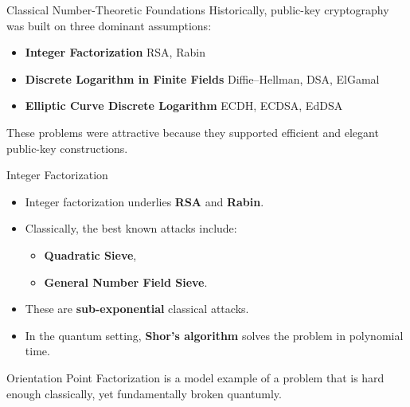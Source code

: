 \documentclass[aspectratio=169]{beamer}
\begin{document}
	\begin{frame}{Classical Number-Theoretic Foundations}
		Historically, public-key cryptography was built on three dominant assumptions:
		\begin{itemize}
			\item \textbf{Integer Factorization} \hfill RSA, Rabin
			\item \textbf{Discrete Logarithm in Finite Fields} \hfill Diffie--Hellman, DSA, ElGamal
			\item \textbf{Elliptic Curve Discrete Logarithm} \hfill ECDH, ECDSA, EdDSA
		\end{itemize}
		
		\vspace{0.5em}
		These problems were attractive because they supported efficient and elegant public-key constructions.
	\end{frame}
	
	\begin{frame}{Integer Factorization}
		\begin{itemize}
			\item Integer factorization underlies \textbf{RSA} and \textbf{Rabin}.
			\item Classically, the best known attacks include:
			\begin{itemize}
				\item \textbf{Quadratic Sieve},
				\item \textbf{General Number Field Sieve}.
			\end{itemize}
			\item These are \textbf{sub-exponential} classical attacks.
			\item In the quantum setting, \textbf{Shor's algorithm} solves the problem in polynomial time.
		\end{itemize}
		
		\begin{block}{Orientation Point}
			Factorization is a model example of a problem that is hard enough classically, yet fundamentally broken quantumly.
		\end{block}
	\end{frame}
	
\end{document}

